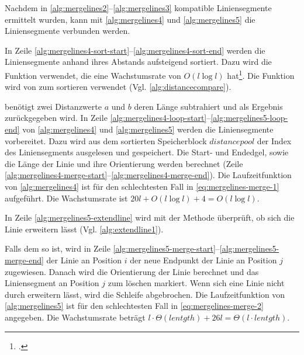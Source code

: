 Nachdem in \autoref{alg:mergelines2}--\autoref{alg:mergelines3} kompatible Liniensegmente ermittelt wurden, kann mit
 \autoref{alg:mergelines4} und \autoref{alg:mergelines5} die Liniensegmente verbunden werden.

In Zeile \ref{alg:mergelines4-sort-start}--\ref{alg:mergelines4-sort-end} werden die Liniensegmente anhand ihres
 Abstands aufsteigend sortiert. Dazu wird die Funktion  verwendet, die eine Wachstumsrate von
 $O(l \log l)$ hat\footcite{qsort}. Die Funktion  wird von  zum
 sortieren verwendet (Vgl. \autoref{alg:distancecompare}).

 benötigt zwei Distanzwerte $a$ und $b$ deren Länge subtrahiert und als Ergebnis zurückgegeben
 wird. In Zeile \ref{alg:mergelines4-loop-start}--\ref{alg:mergelines5-loop-end} von \autoref{alg:mergelines4} und
 \autoref{alg:mergelines5} werden die Liniensegmente vorbereitet. Dazu wird aus dem sortierten Speicherblock
 $\mathit{distancepool}$ der Index des Liniensegments ausgelesen und gespeichert. Die Start- und Endedgel, sowie die
 Länge der Linie und ihre Orientierung werden berechnet
 (Zeile \ref{alg:mergelines4-merge-start}--\ref{alg:mergelines4-merge-end}). Die Laufzeitfunktion von
 \autoref{alg:mergelines4} ist für den schlechtesten Fall in \autoref{eq:mergelines-merge-1} aufgeführt. Die
 Wachstumsrate ist $20l + O(l \log l) + 4 = O(l \log l)$.

In Zeile \ref{alg:mergelines5-extendline} wird mit der Methode  überprüft, ob sich die Linie
 erweitern lässt (Vgl. \autoref{alg:extendline1}).

Falls dem so ist, wird in Zeile \ref{alg:mergelines5-merge-start}--\ref{alg:mergelines5-merge-end} der Linie an
 Position $i$ der neue Endpunkt der Linie an Position $j$ zugewiesen. Danach wird die Orientierung der Linie berechnet
 und das Liniensegment an Position $j$ zum löschen markiert. Wenn sich eine Linie nicht durch 
 erweitern lässt, wird die Schleife abgebrochen. Die Laufzeitfunktion von \autoref{alg:mergelines5} ist für den
 schlechtesten Fall in \autoref{eq:mergelines-merge-2} angegeben. Die Wachstumsrate beträgt
 $l \cdot \Theta(\mathit{lentgth}) + 26l = \Theta(l\cdot\mathit{lentgth})$.


